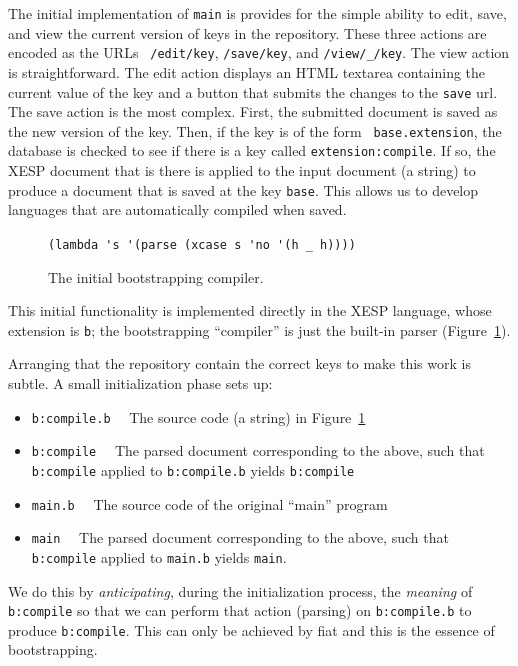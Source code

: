\documentclass[twocolumn]{article}
\begin{document}
The initial implementation of {\tt main} is provides for the simple
ability to edit, save, and view the current version of keys in the
repository. These three actions are encoded as the URLs {\tt
/edit/key}, {\tt /save/key}, and {\tt /view/\_/key}. The view action
is straightforward. The edit action displays an HTML
textarea containing the current value of the key and a
button that submits the changes to the {\tt save} url. The save action
is the most complex. First, the submitted document is saved as the new
version of the key. Then, if the key is of the form {\tt
base.extension}, the database is checked to see if there is a key
called {\tt extension:compile}. If so, the XESP document that is there
is applied to the input document (a string) to produce a document that
is saved at the key {\tt base}. This allows us to develop languages
that are automatically compiled when saved.

\begin{figure}
\begin{center}
\verb+(lambda 's '(parse (xcase s 'no '(h _ h))))+
\end{center}
\caption{The initial bootstrapping compiler.} \label{fig:b:compile.b}
\end{figure}

This initial functionality is implemented directly in the XESP
language, whose extension is {\tt b}; the bootstrapping ``compiler''
is just the built-in parser (Figure~\ref{fig:b:compile.b}).

Arranging that the repository contain the correct keys to make this
work is subtle. A small initialization phase sets up:
\begin{itemize}
\item {\tt b:compile.b}$\quad$ 
      The source code (a string) in Figure~\ref{fig:b:compile.b}
\item {\tt b:compile}$\quad$ 
      The parsed document corresponding to the above, such that {\tt b:compile} applied to {\tt b:compile.b} yields {\tt b:compile}
\item {\tt main.b}$\quad$ 
      The source code of the original ``main'' program
\item {\tt main}$\quad$
      The parsed document corresponding to the above, such that {\tt b:compile} applied to {\tt main.b} yields {\tt main}.
\end{itemize}

We do this by {\em anticipating}, during the initialization process,
the {\em meaning} of {\tt b:compile} so that we can perform that
action (parsing) on {\tt b:compile.b} to produce {\tt b:compile}. This
can only be achieved by fiat and this is the essence of bootstrapping.
\end{document}
